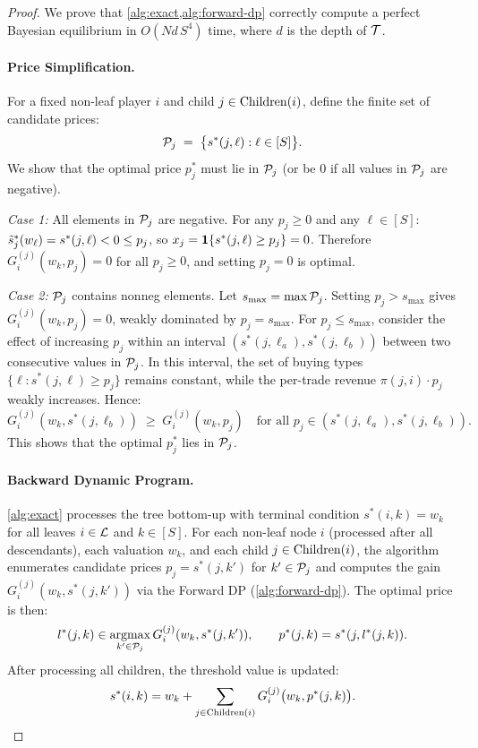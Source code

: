 \begin{proof}
We prove that \cref{alg:exact,alg:forward-dp} correctly compute a perfect Bayesian equilibrium in $O(N d\, S^4)$ time, where $d$ is the depth of $\mathcal{T}$.

\paragraph{Price Simplification.}
For a fixed non-leaf player $i$ and child $j \in \operatorname{Children}(i)$, define the finite set of candidate prices:
\begin{equation}
\label{eq:prf:algo:candidates}
\mathcal{P}_j \;=\; \big\{s^*(j, \ell) : \ell \in [S]\big\}.
\end{equation}
We show that the optimal price $p^*_j$ must lie in $\mathcal{P}_j$ (or be $0$ if all values in $\mathcal{P}_j$ are negative).

\emph{Case 1:} All elements in $\mathcal{P}_j$ are negative. For any $p_j \ge 0$ and any $\ell \in [S]$: $\tilde{s}^*_j(w_\ell) = s^*(j,\ell) < 0 \le p_j$, so $x_j = \bm{1}\{s^*(j,\ell) \ge p_j\} = 0$. Therefore $G^{(j)}_i(w_k, p_j) = 0$ for all $p_j \ge 0$, and setting $p_j = 0$ is optimal.

\emph{Case 2:} $\mathcal{P}_j$ contains nonneg elements. Let $s_{\max} = \max \mathcal{P}_j$. Setting $p_j > s_{\max}$ gives $G^{(j)}_i(w_k, p_j) = 0$, weakly dominated by $p_j = s_{\max}$. For $p_j \le s_{\max}$, consider the effect of increasing $p_j$ within an interval $(s^*(j, \ell_a), s^*(j, \ell_b))$ between two consecutive values in $\mathcal{P}_j$. In this interval, the set of buying types $\{\ell : s^*(j,\ell) \ge p_j\}$ remains constant, while the per-trade revenue $\pi(j,i) \cdot p_j$ weakly increases. Hence:
\begin{equation}
\label{eq:prf:algo:monotone}
G^{(j)}_i(w_k, s^*(j,\ell_b)) \;\ge\; G^{(j)}_i(w_k, p_j) \quad \text{for all } p_j \in (s^*(j,\ell_a), s^*(j,\ell_b)).
\end{equation}
This shows that the optimal $p^*_j$ lies in $\mathcal{P}_j$.

\paragraph{Backward Dynamic Program.}
\cref{alg:exact} processes the tree bottom-up with terminal condition $s^*(i,k) = w_k$ for all leaves $i \in \mathcal{L}$ and $k \in [S]$. For each non-leaf node $i$ (processed after all descendants), each valuation $w_k$, and each child $j \in \operatorname{Children}(i)$, the algorithm enumerates candidate prices $p_j = s^*(j, k')$ for $k' \in \mathcal{P}_j$ and computes the gain $G^{(j)}_i(w_k, s^*(j,k'))$ via the Forward DP (\cref{alg:forward-dp}). The optimal price is then:
\begin{equation}
\label{eq:prf:algo:optimal}
l^*(j,k) \in \operatorname*{argmax}_{k' \in \mathcal{P}_j} G^{(j)}_i(w_k, s^*(j,k')), \qquad p^*(j,k) = s^*(j, l^*(j,k)).
\end{equation}
After processing all children, the threshold value is updated:
\begin{equation}
\label{eq:prf:algo:threshold}
s^*(i,k) = w_k + \sum_{j \in \operatorname{Children}(i)} G^{(j)}_i\big(w_k, p^*(j,k)\big).
\end{equation}


\end{proof}
